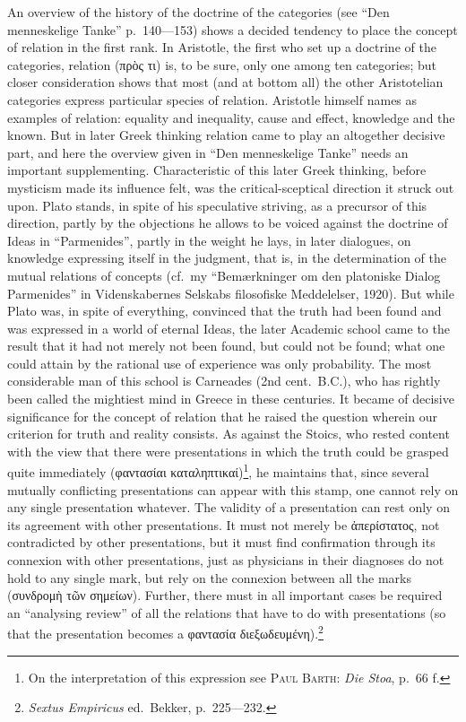 \documentclass[12pt]{article}
\newcommand{\opage}[1]{\marginnote{\footnotesize\textit{[#1]}}}
\begin{document}
\bigskip
An overview of the history of the doctrine of the categories (see ``Den
menneskelige Tanke'' p.~140---153) shows a decided tendency to place the
concept of relation in the first rank. In Aristotle, the first who set up a
doctrine of the categories, relation (πρὸς τι) is, to be sure, only one
among ten categories; but closer consideration shows that most (and at
bottom all) the other Aristotelian categories express particular species of
relation. Aristotle himself names as examples of relation: equality and
inequality, cause and effect, knowledge and the known. But in later Greek
thinking relation came to play an altogether decisive part, and here the
\opage{6}overview given in ``Den menneskelige Tanke'' needs an important
supplementing. Characteristic of this later Greek thinking, before mysticism
made its influence felt, was the critical-sceptical direction it struck out
upon. Plato stands, in spite of his speculative striving, as a precursor of
this direction, partly by the objections he allows to be voiced against the
doctrine of Ideas in ``Parmenides'', partly in the weight he lays, in later
dialogues, on knowledge expressing itself in the judgment, that is, in the
determination of the mutual relations of concepts (cf.\ my ``Bemærkninger om
den platoniske Dialog Parmenides'' in Videnskabernes Selskabs filosofiske
Meddelelser, 1920). But while Plato was, in spite of everything, convinced
that the truth had been found and was expressed in a world of eternal Ideas,
the later Academic school came to the result that it had not merely not been
found, but could not be found; what one could attain by the rational use of
experience was only probability. The most considerable man of this school is
Carneades (2nd cent.\ B.C.), who has rightly been called the mightiest mind
in Greece in these centuries. It became of decisive significance for the
concept of relation that he raised the question wherein our criterion for
truth and reality consists. As against the Stoics, who rested content with
the view that there were presentations in which the truth could be grasped
quite immediately (φαντασίαι καταληπτικαί)\footnote{On the interpretation of
this expression see \textsc{Paul Barth}: \textit{Die Stoa}, p.~66 f.}, he
maintains that, since several mutually conflicting presentations can appear
with this stamp, one cannot rely on any single presentation whatever. The
validity of a presentation can rest only on its agreement with other
presentations. It must not merely be ἀπερίστατος, not contradicted by other
presentations, but it must find confirmation through its connexion with
other presentations, just as physicians \opage{7}in their diagnoses do not hold to
any single mark, but rely on the connexion between all the marks (συνδρομὴ
τῶν σημείων). Further, there must in all important cases be required an
``analysing review'' of all the relations that have to do with presentations
(so that the presentation becomes a φαντασία
διεξωδευμένη).\footnote{\textit{Sextus Empiricus} ed.\ Bekker,
p.~225---232.}
\end{document}
